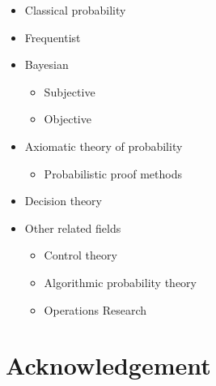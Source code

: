 \documentclass{article}
\theoremstyle{definition}
\begin{document}
\begin{itemize}
    \item Classical probability \cite{book:Laplace}
    \item Frequentist \cite{book:VonMises}
    \item Bayesian
    \begin{itemize}
        \item Subjective \cite{book:deFinetti}
        \item Objective \cite{book:Jaynes}
    \end{itemize}
    \item Axiomatic theory of probability \cite{book:Kolmogorov,book:Klenke}
    \begin{itemize}
        \item Probabilistic proof methods \cite{book:ProofsFromTHEBOOK,book:TheProbabilisticMethod}
    \end{itemize}
    \item Decision theory \cite{book:DecisionTheory,book:GilboaDecision,book:IntroductionToDecisionTheory,paper:DecisionTheoryAnOverview}
    \item Other related fields
    \begin{itemize}
        \item Control theory \cite{book:Control}
        \item Algorithmic probability theory \cite{book:Solomonoff,book:Vitanyi,book:UniversalArtificialIntelligence}
        \item Operations Research \cite{book:OperationsResearch,book:IntroductionOperationsResearch}
    \end{itemize}
\end{itemize}


\section{Acknowledgement}
\end{document}
